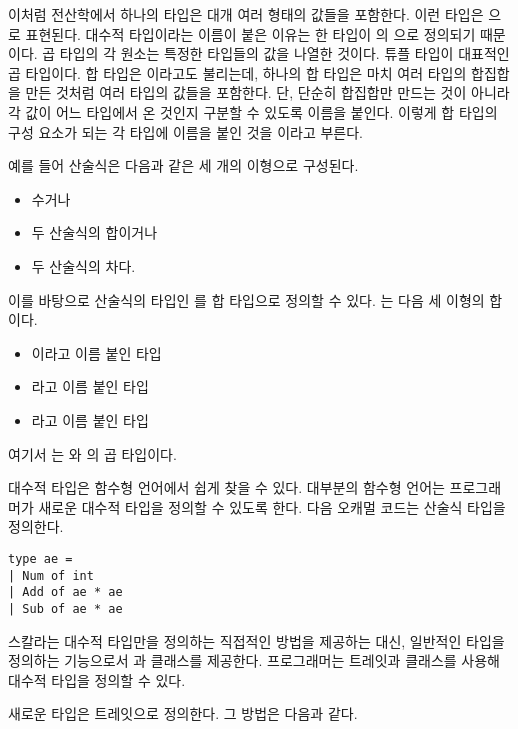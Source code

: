 이처럼 전산학에서 하나의 타입은 대개 여러 형태의 값들을 포함한다. 이런 타입은
으로 표현된다. 대수적 타입이라는
이름이 붙은 이유는 한 타입이 의 으로 정의되기 때문이다. 곱 타입의 각 원소는 특정한 타입들의 값을 나열한
것이다. 튜플 타입이 대표적인 곱 타입이다. 합 타입은 이라고도 불리는데, 하나의 합 타입은 마치 여러 타입의
합집합을 만든 것처럼 여러 타입의 값들을 포함한다. 단, 단순히 합집합만 만드는
것이 아니라 각 값이 어느 타입에서 온 것인지 구분할 수 있도록 이름을 붙인다.
이렇게 합 타입의 구성 요소가 되는 각 타입에 이름을 붙인 것을
이라고 부른다.

예를 들어 산술식은 다음과 같은 세 개의 이형으로 구성된다.

\begin{itemize}
\item 수거나
\item 두 산술식의 합이거나
\item 두 산술식의 차다.
\end{itemize}

이를 바탕으로 산술식의 타입인 를 합 타입으로 정의할 수 있다. 는 다음 세 이형의 합이다.

\begin{itemize}
\item {}이라고 이름 붙인  타입
\item {}라고 이름 붙인  타입
\item {}라고 이름 붙인  타입
\end{itemize}

여기서 는 와 의 곱 타입이다.

대수적 타입은 함수형 언어에서 쉽게 찾을 수 있다. 대부분의 함수형 언어는
프로그래머가 새로운 대수적 타입을 정의할 수 있도록 한다. 다음 오캐멀 코드는
산술식 타입을 정의한다.

\begin{verbatim}
type ae =
| Num of int
| Add of ae * ae
| Sub of ae * ae
\end{verbatim}

스칼라는 대수적 타입만을 정의하는 직접적인 방법을 제공하는 대신, 일반적인 타입을
정의하는 기능으로서 과 클래스를 제공한다. 프로그래머는
트레잇과 클래스를 사용해 대수적 타입을 정의할 수 있다.

새로운 타입은 트레잇으로 정의한다. 그 방법은 다음과 같다.

